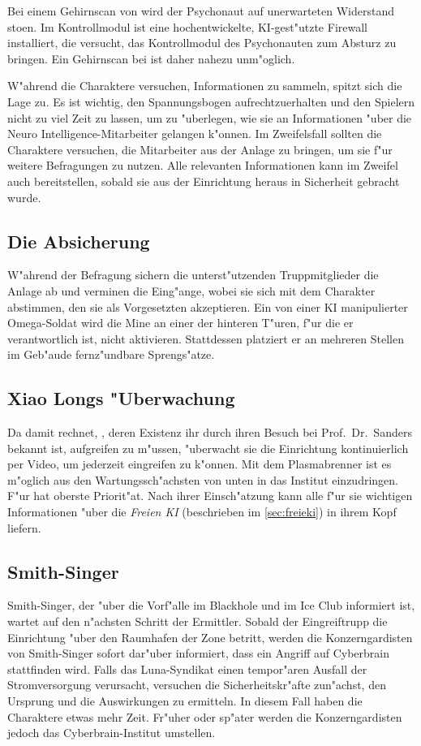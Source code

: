 Bei einem Gehirnscan von \ml{} wird der Psychonaut auf unerwarteten Widerstand sto\3en. Im Kontrollmodul ist eine hochentwickelte, KI-gest"utzte Firewall installiert, die versucht, das Kontrollmodul des Psychonauten zum Absturz zu bringen. Ein Gehirnscan bei \ml{} ist daher nahezu unm"oglich.

\begin{remarks}
	W"ahrend die Charaktere versuchen, Informationen zu sammeln, spitzt sich die Lage zu. Es ist wichtig, den Spannungsbogen aufrechtzuerhalten und den Spielern nicht zu viel Zeit zu lassen, um zu "uberlegen, wie sie an Informationen "uber die Neuro Intelligence-Mitarbeiter gelangen k"onnen. Im Zweifelsfall sollten die Charaktere versuchen, die Mitarbeiter aus der Anlage zu bringen, um sie f"ur weitere Befragungen zu nutzen. Alle relevanten Informationen kann im Zweifel auch \ml{} bereitstellen, sobald sie aus der Einrichtung heraus in Sicherheit gebracht wurde.
\end{remarks}

\subsection{Die Absicherung} 
W"ahrend der Befragung sichern die unterst"utzenden Truppmitglieder die Anlage ab und verminen die Eing"ange, wobei sie sich mit dem Charakter abstimmen, den sie als Vorgesetzten akzeptieren. Ein von einer KI manipulierter Omega-Soldat wird die Mine an einer der hinteren T"uren, f"ur die er verantwortlich ist, nicht aktivieren. Stattdessen platziert er an mehreren Stellen im Geb"aude fernz"undbare Sprengs"atze.

\subsection[\xl{}s "Uberwachung]{Xiao Longs "Uberwachung}  
Da \xl{} damit rechnet, \ml{}, deren Existenz ihr durch ihren Besuch bei Prof.~Dr.~Sanders bekannt ist, aufgreifen zu m"ussen, "uberwacht sie die Einrichtung kontinuierlich per Video, um jederzeit eingreifen zu k"onnen. Mit dem Plasmabrenner ist es m"oglich aus den Wartungssch"achsten von unten in das Institut einzudringen. F"ur \xl{} hat \ml{} oberste Priorit"at. Nach ihrer Einsch"atzung kann \ml{} alle f"ur sie wichtigen Informationen "uber die \emph{Freien KI} (beschrieben im \cref{sec:freieki}) in ihrem Kopf liefern.

\subsection{Smith-Singer} 
Smith-Singer, der "uber die Vorf"alle im Blackhole und im Ice Club informiert ist, wartet auf den n"achsten Schritt der Ermittler. Sobald der Eingreiftrupp die Einrichtung "uber den Raumhafen der Zone betritt, werden die Konzerngardisten von Smith-Singer sofort dar"uber informiert, dass ein Angriff auf Cyberbrain stattfinden wird. Falls das Luna-Syndikat einen tempor"aren Ausfall der Stromversorgung verursacht, versuchen die Sicherheitskr"afte zun"achst, den Ursprung und die Auswirkungen zu ermitteln. In diesem Fall haben die Charaktere etwas mehr Zeit. Fr"uher oder sp"ater werden die Konzerngardisten jedoch das Cyberbrain-Institut umstellen. 

